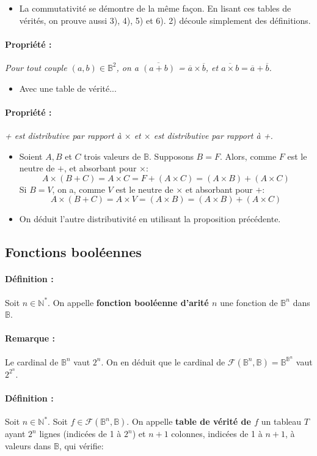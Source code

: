 \documentclass{scrartcl}
\newcommand{\prop}[1]{\paragraph{Propriété : } \textsl{#1}\\}
\newcommand{\rem}[1]{\paragraph{Remarque : } #1\\}
\newenvironment{demo}{\begin{itemize}[label=$\triangleright$]\item }{\end{itemize}}
\newcommand{\corrpar}{\vspace{-20pt}}
\begin{document}
			\begin{demo}
				La commutativité se démontre de la même façon. 
				En lisant ces tables de vérités, on prouve aussi 3), 4), 5) et 6). 2) découle simplement des définitions.
			\end{demo}
			
			\prop{Pour tout couple $(a,b)\in\mathbb{B}^2$, on a $\overline{(a+b)}$ = $\overline{a} \times \overline{b}$, et $\overline{a\times b} = \overline{a} + \overline{b}$.}
			\begin{demo}
				Avec une table de vérité...
			\end{demo}

			\prop{+ est distributive par rapport à $\times$ et $\times$ est distributive par rapport à +.}
			\begin{demo}
				Soient $A, B$ et $C$ trois valeurs de $\mathbb{B}$. Supposons $B = F$. Alors, comme $F$ est le neutre de $+$, et absorbant pour $\times$:
				\[ A \times (B+C) = A \times C =  F + (A \times C) = (A \times B) + (A \times C)\]
				Si $B = V$, on a, comme $V$ est le neutre de $\times$ et absorbant pour $+$:
				\[ A \times (B+C) = A \times V = (A \times B) = (A \times B) + (A \times C) \]
			\end{demo}
			\begin{demo}
				On déduit l'autre distributivité en utilisant la proposition précédente.
			\end{demo}

		\subsection{Fonctions booléennes}

			\paragraph{Définition :}Soit $n\in \mathbb{N}^*$. On appelle \textbf{fonction booléenne d'arité $n$} une fonction de $\mathbb{B}^n$ dans $\mathbb{B}$.

			\rem{Le cardinal de $\mathbb{B}^n$ vaut $2^n$. 
			On en déduit que le cardinal de $\mathcal{F}(\mathbb{B}^n,\mathbb{B}) = \mathbb{B}^{\mathbb{B}^n}$ vaut $2^{2^n}$.}

			\corrpar
			\paragraph{Définition :}Soit $n \in \mathbb{N}^*$. Soit $f \in \mathcal{F}(\mathbb{B}^n,\mathbb{B})$. 
			On appelle \textbf{table de vérité de $f$} un tableau $T$ ayant $2^n$ lignes (indicées de 1 à $2^{n}$) et $n+1$ colonnes,
			indicées de 1 à $n+1$, à valeurs dans $\mathbb{B}$, qui vérifie:
\end{document}
